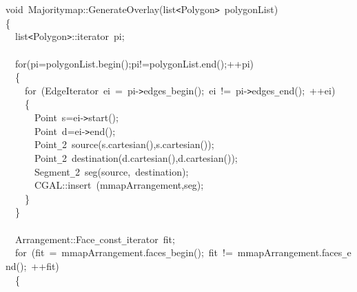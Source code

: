 {
\noindent \ttfamily
\jttstylej void~\jttstylek Majoritymap::GenerateOverlay\jttstylei (\jttstylek list\verb#<#Polygon\verb#>#~polygonList\jttstylei )\\
\jttstylei \{\\
\jttstylea ~~\jttstylek list\verb#<#Polygon\verb#>#::iterator~pi;\\
\jttstylea \\
\jttstylea ~~\jttstylee for\jttstylei (\jttstylek pi=polygonList.begin\jttstylei ()\jttstylek ;pi!=polygonList.end\jttstylei ()\jttstylek ;++pi\jttstylei )\\
\jttstylea ~~\jttstylei \{\\
\jttstylea ~~~~\jttstylee for~\jttstylei (\jttstylek EdgeIterator~ei~=~pi-\verb#>#edges\verb#_#begin\jttstylei ()\jttstylek ;~ei~!=~pi-\verb#>#edges\verb#_#end\jttstylei ()\jttstylek ;~++ei\jttstylei )\\
\jttstylea ~~~~\jttstylei \{\\
\jttstylea ~~~~~~\jttstylek Point~s=ei-\verb#>#start\jttstylei ()\jttstylek ;\\
\jttstylea ~~~~~~\jttstylek Point~d=ei-\verb#>#end\jttstylei ()\jttstylek ;\\
\jttstylea ~~~~~~\jttstylek Point\verb#_#2~source\jttstylei (\jttstylek s.cartesian\jttstylei (\jttstylei )\jttstylek ,s.cartesian\jttstylei (\jttstylei ))\jttstylek ;\\
\jttstylea ~~~~~~\jttstylek Point\verb#_#2~destination\jttstylei (\jttstylek d.cartesian\jttstylei (\jttstylei )\jttstylek ,d.cartesian\jttstylei (\jttstylei ))\jttstylek ;\\
\jttstylea ~~~~~~\jttstylek Segment\verb#_#2~seg\jttstylei (\jttstylek source,~destination\jttstylei )\jttstylek ;\\
\jttstylea ~~~~~~\jttstylek CGAL::insert~\jttstylei (\jttstylek mmapArrangement,seg\jttstylei )\jttstylek ;\\
\jttstylea ~~~~\jttstylei \}\\
\jttstylea ~~\jttstylei \}\\
\jttstylea \\
\jttstylea ~~\jttstylek Arrangement::Face\verb#_#const\verb#_#iterator~fit;\\
\jttstylea ~~\jttstylee for~\jttstylei (\jttstylek fit~=~mmapArrangement.faces\verb#_#begin\jttstylei ()\jttstylek ;~fit~!=~mmapArrangement.faces\verb#_#end\jttstylei ()\jttstylek ;~++fit\jttstylei )\\
\jttstylea ~~\jttstylei \{\\
}
